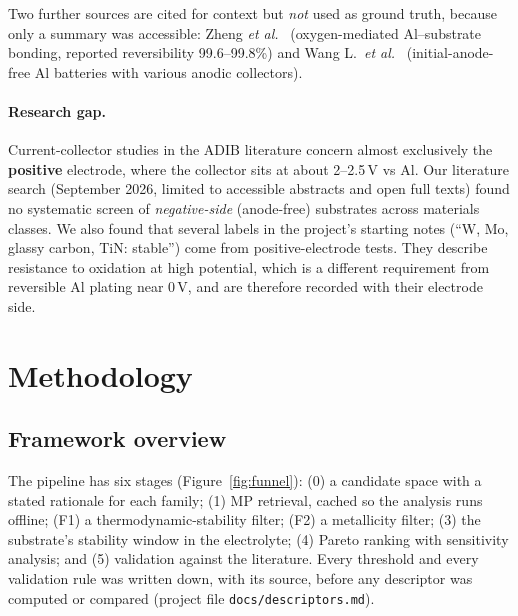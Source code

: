 \documentclass{report}
\begin{document}
Two further sources are cited for context but \emph{not} used as ground truth, because only a summary was accessible: Zheng \emph{et al.}~\citep{Zheng2021} (oxygen-mediated Al--substrate bonding, reported reversibility 99.6--99.8\%) and Wang L.\ \emph{et al.}~\citep{WangL2021} (initial-anode-free Al batteries with various anodic collectors).

\paragraph{Research gap.} Current-collector studies in the ADIB literature concern almost exclusively the \textbf{positive} electrode, where the collector sits at about 2--2.5\,V vs Al. Our literature search (September 2026, limited to accessible abstracts and open full texts) found no systematic screen of \emph{negative-side} (anode-free) substrates across materials classes. We also found that several labels in the project's starting notes (``W, Mo, glassy carbon, TiN: stable'') come from positive-electrode tests. They describe resistance to oxidation at high potential, which is a different requirement from reversible Al plating near 0\,V, and are therefore recorded with their electrode side.

\pagebreak
\section{Methodology}
\label{sec:method}

\subsection{Framework overview}
The pipeline has six stages (Figure~\ref{fig:funnel}): (0) a candidate space with a stated rationale for each family; (1) MP retrieval, cached so the analysis runs offline; (F1) a thermodynamic-stability filter; (F2) a metallicity filter; (3) the substrate's stability window in the electrolyte; (4) Pareto ranking with sensitivity analysis; and (5) validation against the literature. Every threshold and every validation rule was written down, with its source, before any descriptor was computed or compared (project file \texttt{docs/descriptors.md}).
\end{document}
